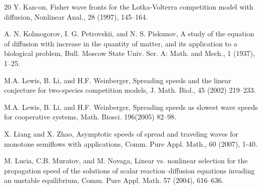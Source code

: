 \documentclass[11pt,a4paper]{article}
\numberwithin{equation}{section}
\numberwithin{figure}{section}
\begin{document}
\begin{thebibliography}{20}
{Y. Kan-on}, Fisher wave fronts for the Lotka-Volterra competition model with diffusion, Nonlinear Anal., 28 (1997), 145--164.


{A. N. Kolmogorov, I. G. Petrovskii, and N. S. Piskunov},
A study of the equation of diffusion with increase in the quantity of matter, and its application to a biological problem,
Bull. Moscow State Univ. Ser. A: Math. and Mech., 1 (1937), 1--25.

{M.A. Lewis, B. Li, and H.F. Weinberger}, Spreading speeds and the linear conjecture for two-species competition models, J. Math. Biol., 45 (2002) 219--233.

{M.A. Lewis, B. Li, and H.F. Weinberger},  Spreading speeds as slowest wave speeds for cooperative systems, Math. Biosci. 196(2005) 82–98.



{X. Liang and X. Zhao}, Asymptotic speeds of spread and traveling waves for monotone
semiflows with applications, Comm. Pure Appl. Math., 60 (2007), 1-40.






{M. Lucia, C.B. Muratov, and M. Novaga},
Linear vs. nonlinear selection for the propagation speed of the solutions of scalar reaction–diffusion
equations invading an unstable equilibrium, Comm. Pure Appl. Math. 57 (2004), 616–636.


\end{thebibliography}
\end{document}
